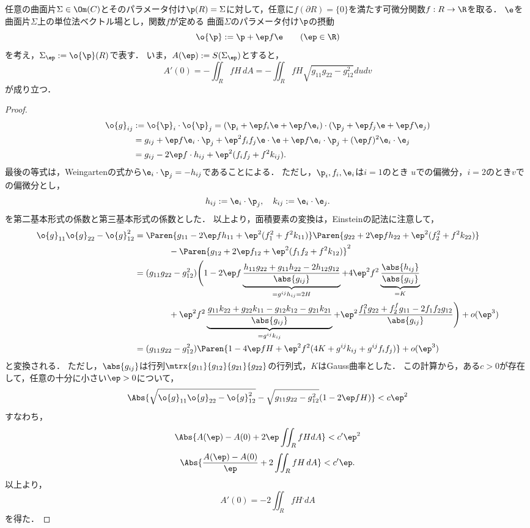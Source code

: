 \documentclass[uplatex,dvipdfmx]{jsarticle}
\begin{document}
\begin{lemma*}
    任意の曲面片$\Sigma\in\Om(C)$とそのパラメータ付け$\p(R)=\Sigma$に対して，任意に$f(\partial R)=\{0\}$を満たす可微分関数$f:R\to\R$を取る．
    $\e$を曲面片$\Sigma$上の単位法ベクトル場とし，関数$f$が定める
    曲面$\Sigma$のパラメータ付け$\p$の摂動
    \[\o{\p}:=\p+\ep f\e\qquad(\ep\in\R)\]
    を考え，$\Sigma_\ep:=\o{\p}(R)$で表す．
    いま，$A(\ep):=S(\Sigma_\ep)$とすると，
    \[A'(0)=-\iint_RfH\,dA=-\iint_RfH\sqrt{g_{11}g_{22}-g_{12}^2}dudv\]
    が成り立つ．
\end{lemma*}
\begin{proof}
    \begin{align*}
        \o{g}_{ij}&:=\o{\p}_i\cdot\o{\p}_j=(\p_i+\ep f_i\e+\ep f\e_i)\cdot(\p_j+\ep f_j\e+\ep f\e_j)\\
        &=g_{ij}+\ep f\e_i\cdot\p_j+\ep^2f_if_j\e\cdot\e+\ep f\e_i\cdot\p_j+(\ep f)^2\e_i\cdot\e_j\\
        &=g_{ij}-2\ep f\cdot h_{ij}+\ep^2(f_if_j+f^2k_{ij}).
    \end{align*}
    最後の等式は，Weingartenの式から$\e_i\cdot\p_j=-h_{ij}$であることによる．
    ただし，$\p_i,f_i,\e_i$は$i=1$のとき
    $u$での偏微分，$i=2$のとき$v$での偏微分とし，
    \[h_{ij}:=\e_i\cdot\p_j,\quad k_{ij}:=\e_i\cdot\e_j.\]
    を第二基本形式の係数と第三基本形式の係数とした．
    以上より，面積要素の変換は，Einsteinの記法に注意して，
    \begin{align*}
        \o{g}_{11}\o{g}_{22}-\o{g}_{12}^2&=\Paren{g_{11}-2\ep fh_{11}+\ep^2(f_1^2+f^2k_{11})}\Paren{g_{22}+2\ep fh_{22}+\ep^2(f^2_2+f^2k_{22})}\\
        &\qquad\qquad-\Paren{g_{12}+2\ep f_{12}+\ep^2(f_1f_2+f^2k_{12})}^2\\
        &=(g_{11}g_{22}-g_{12}^2)\Biggl(1 - 2\ep f\underbrace{\frac{h_{11}g_{22}+g_{11}h_{22}-2h_{12}g_{12}}{\abs{g_{ij}}}}_{=g^{ij}h_{ij}=2H} +4 \ep^2f^2\underbrace{\frac{\abs{h_{ij}}}{\abs{g_{ij}}}}_{=K}\\
        &\qquad\qquad+\ep^2f^2\underbrace{\frac{g_{11}k_{22}+g_{22}k_{11}-g_{12}k_{12}-g_{21}k_{21}}{\abs{g_{ij}}}}_{=g^{ij}k_{ij}}+\ep^2\frac{f_1^2g_{22}+f_2^fg_{11}-2f_1f_2g_{12}}{\abs{g_{ij}}}\Biggr)+o(\ep^3)\\
        &=(g_{11}g_{22}-g_{12}^2)\Paren{1-4\ep fH+\ep^2f^2(4K+g^{ij}k_{ij}+g^{ij}f_if_j)}+o(\ep^3)
    \end{align*}
    と変換される．
    ただし，$\abs{g_{ij}}$は行列$\mtrx{g_{11}}{g_{12}}{g_{21}}{g_{22}}$の行列式，$K$はGauss曲率とした．
    この計算から，ある$c>0$が存在して，任意の十分に小さい$\ep>0$について，
    \[\Abs{\sqrt{\o{g}_{11}\o{g}_{22}-\o{g}_{12}^2}-\sqrt{g_{11}g_{22}-g_{12}^2}(1-2\ep fH)}<c\ep^2\]
    すなわち，
    \[\Abs{A(\ep)-A(0)+2\ep\iint_RfHdA}<c'\ep^2\]
    \[\Abs{\frac{A(\ep)-A(0)}{\ep}+2\iint_RfH\,dA}<c'\ep.\]
    以上より，
    \[A'(0)=-2\iint_RfH^,dA\]
    を得た．
\end{proof}
\end{document}
